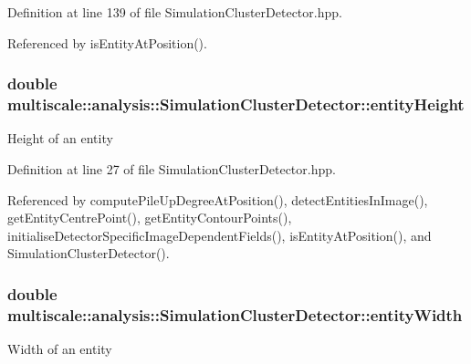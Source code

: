 \-Definition at line 139 of file \-Simulation\-Cluster\-Detector.\-hpp.



\-Referenced by is\-Entity\-At\-Position().

\hypertarget{classmultiscale_1_1analysis_1_1SimulationClusterDetector_a2ba5c2738d32f71ccaacba4129b7bcfc}{
\subsubsection[{entity\-Height}]{\setlength{\rightskip}{0pt plus 5cm}double {\bf multiscale\-::analysis\-::\-Simulation\-Cluster\-Detector\-::entity\-Height}}}\label{classmultiscale_1_1analysis_1_1SimulationClusterDetector_a2ba5c2738d32f71ccaacba4129b7bcfc}
\-Height of an entity 

\-Definition at line 27 of file \-Simulation\-Cluster\-Detector.\-hpp.



\-Referenced by compute\-Pile\-Up\-Degree\-At\-Position(), detect\-Entities\-In\-Image(), get\-Entity\-Centre\-Point(), get\-Entity\-Contour\-Points(), initialise\-Detector\-Specific\-Image\-Dependent\-Fields(), is\-Entity\-At\-Position(), and \-Simulation\-Cluster\-Detector().

\hypertarget{classmultiscale_1_1analysis_1_1SimulationClusterDetector_a9212da88b787b8f9791f27d913b6d05d}{
\subsubsection[{entity\-Width}]{\setlength{\rightskip}{0pt plus 5cm}double {\bf multiscale\-::analysis\-::\-Simulation\-Cluster\-Detector\-::entity\-Width}}}\label{classmultiscale_1_1analysis_1_1SimulationClusterDetector_a9212da88b787b8f9791f27d913b6d05d}
\-Width of an entity 

